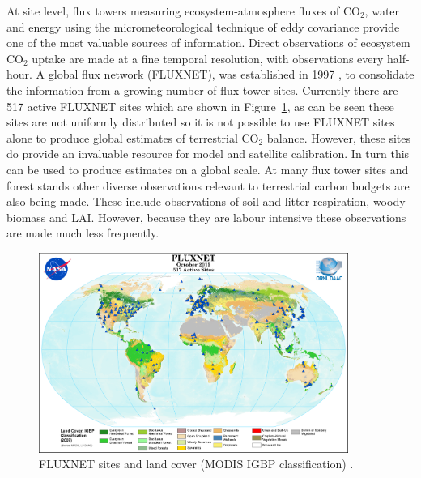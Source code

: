 \documentclass[12pt]{article}
\begin{document}
At site level, flux towers measuring ecosystem-atmosphere fluxes of CO\(_{2}\), water and energy using the micrometeorological technique of eddy covariance provide one of the most valuable sources of information. Direct observations of ecosystem CO\(_{2}\) uptake are made at a fine temporal resolution, with observations every half-hour. A global flux network (FLUXNET), was established in 1997 \citep{baldocchi2001fluxnet}, to consolidate the information from a growing number of flux tower sites. Currently there are 517 active FLUXNET sites which are shown in Figure~\ref{fig:fluxnet_2015}, as can be seen these sites are not uniformly distributed so it is not possible to use FLUXNET sites alone to produce global estimates of terrestrial CO\(_{2}\) balance. However, these sites do provide an invaluable resource for model and satellite calibration. In turn this can be used to produce estimates on a global scale. At many flux tower sites and forest stands other diverse observations relevant to terrestrial carbon budgets are also being made. These include observations of soil and litter respiration, woody biomass and LAI. However, because they are labour intensive these observations are made much less frequently.     

\begin{figure}[ht]
\centering
\includegraphics[width=0.9\textwidth]{FluxNetworkMODIS_IGBP_10-2015.png}
\caption{FLUXNET sites and land cover (MODIS IGBP classification) \citep{fluxnetsite2013}.}
\label{fig:fluxnet_2015}
\end{figure}
\end{document}
